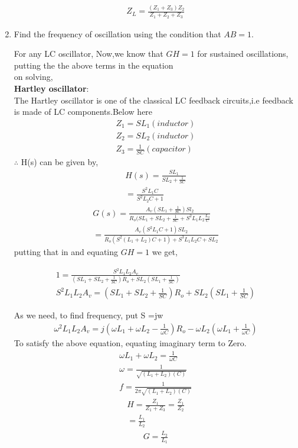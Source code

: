 \begin{enumerate}[label=\thesection.\arabic*.,ref=\thesection.\theenumi]
\begin{align}    
    Z_L = \frac{(Z_1 + Z_3)Z_2}{Z_1+Z_2+Z_3}
\end{align}


\item Find the frequency of oscillation using the condition that $AB = 1$.

\solution For any LC oscillator, 
Now,we know that $GH = 1$ for sustained oscillations, putting the the above terms in the equation\\
on solving,\\
    
\textbf{Hartley oscillator}:\\
The Hartley oscillator is one of the classical LC feedback circuits,i.e feedback is made of LC components.Below here 
\begin{align}
    Z_1 = SL_1 (inductor)\\
    Z_2 = SL_2 (inductor)\\
    Z_3 = \frac{1}{SC} (capacitor)
\end{align}
$\therefore$ H(s) can be given by,\\
\begin{align}
    H(s) = \frac{SL_1}{SL_2 + \frac{1}{SC}}\\
        = \frac{S^2L_1C}{S^2L_2C + 1}
\end{align}
\begin{align}
    G(s) = \frac{A_v(SL_1 + \frac{1}{SC})Sl_2}{R_o(SL_1 + SL_2 + \frac{1}{SC} + S^2L_1L_2 \frac{L_2}{C}}\\
        =\frac{A_v(S^2L_1C + 1)SL_2}{R_o(S^2(L_1 + L_2)C +1) + S^3L_1L_2C + SL_2}
\end{align}
putting that in and equating $GH=1$ we get,

\begin{align}
1 = \frac{S^{2}L_1L_2A_v}{(SL_1+SL_2+\frac{1}{SC})R_o+ SL_2(SL_1+\frac{1}{SC})}\\
S^{2}L_1L_2A_v = (SL_1+SL_2+\frac{1}{SC})R_o+ SL_2(SL_1+\frac{1}{SC})
\end{align}

As we need, to find frequency, put S =jw
\begin{align}
    \omega^{2}L_1L_2A_v = j(\omega L_1 + \omega L_2 -\frac{1}{\omega C})R_o -\omega L_2(\omega L_1 + \frac{1}{\omega C})
\end{align}
To satisfy the above equation, equating imaginary term to Zero.
\begin{align}    
    \omega L_1 + \omega L_2  = \frac{1}{\omega C}\\
    \omega = \frac{1}{\sqrt{(L_1+L_2)(C)}}\\
    f = \frac{1}{2\pi \sqrt{(L_1+L_2)(C)}}
\end{align}
\begin{align}
    H = \frac{Z_1}{Z_1 + Z_3} = \frac{Z_1}{Z_2}\\
      = \frac{L_1}{L_2}
    \label{eq:ee18btech11019_B_gain}  
\end{align}
\begin{align}
    G =  \frac{L_2}{L_1} 
\label{eq:ee18btech11019_Amp_gain}
\end{align}
 

\end{enumerate}

